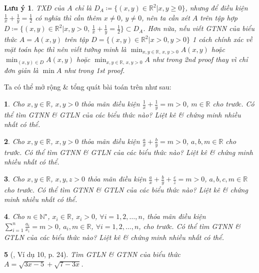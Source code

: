 \documentclass{article}
\newtheorem{baitoan}{}
\newtheorem{luuy}{Lưu ý}
\begin{document}
\begin{luuy}
	TXĐ của $A$ chỉ là $D_A\coloneqq\{(x,y)\in\mathbb{R}^2|x,y\ge0\}$, nhưng để điều kiện $\frac{1}{x} + \frac{1}{y} = \frac{1}{2}$ có nghĩa thì cần thêm $x\ne0$, $y\ne0$, nên ta cần xét $A$ trên tập hợp $D\coloneqq\{(x,y)\in\mathbb{R}^2|x,y > 0,\,\frac{1}{x} + \frac{1}{y} = \frac{1}{2}\}\subset D_A$. Hơn nữa, nếu viết {\rm GTNN} của biểu thức $A = A(x,y)$ trên tập $D = \{(x,y)\in\mathbb{R}^2|x > 0,y > 0\}$ 1 cách chính xác về mặt toán học thì nên viết tường minh là $\min_{x,y\in\mathbb{R},\,x,y > 0} A(x,y)$ hoặc $\min_{(x,y)\in D} A(x,y)$ hoặc $\min_{x,y\in\mathbb{R},\,x,y > 0} A$ như trong 2nd proof thay vì chỉ đơn giản là $\min A$ như trong 1st proof.
\end{luuy}
Ta có thể mở rộng \& tổng quát bài toán trên như sau:

\begin{baitoan}
	Cho $x,y\in\mathbb{R}$, $x,y > 0$ thỏa mãn điều kiện $\frac{1}{x} + \frac{1}{y} = m > 0$, $m\in\mathbb{R}$ cho trước. Có thể tìm {\rm GTNN} \& {\rm GTLN} của các biểu thức nào? Liệt kê \& chứng minh nhiều nhất có thể.
\end{baitoan}

\begin{baitoan}
	Cho $x,y\in\mathbb{R}$, $x,y > 0$ thỏa mãn điều kiện $\frac{a}{x} + \frac{b}{y} = m > 0$, $a,b,m\in\mathbb{R}$ cho trước. Có thể tìm {\rm GTNN} \& {\rm GTLN} của các biểu thức nào? Liệt kê \& chứng minh nhiều nhất có thể.
\end{baitoan}

\begin{baitoan}
	Cho $x,y\in\mathbb{R}$, $x,y,z > 0$ thỏa mãn điều kiện $\frac{a}{x} + \frac{b}{y} + \frac{c}{z} = m > 0$, $a,b,c,m\in\mathbb{R}$ cho trước. Có thể tìm {\rm GTNN} \& {\rm GTLN} của các biểu thức nào? Liệt kê \& chứng minh nhiều nhất có thể.
\end{baitoan}

\begin{baitoan}
	Cho $n\in\mathbb{N}^\star$, $x_i\in\mathbb{R}$, $x_i > 0$, $\forall i = 1,2,\ldots,n$, thỏa mãn điều kiện $\sum_{i=1}^n \frac{a_i}{x_i} = m > 0$, $a_i,m\in\mathbb{R}$, $\forall i = 1,2,\ldots,n$, cho trước. Có thể tìm {\rm GTNN} \& {\rm GTLN} của các biểu thức nào? Liệt kê \& chứng minh nhiều nhất có thể.
\end{baitoan}

\begin{baitoan}[\cite{Tuyen_Toan_9_old}, Ví dụ 10, p. 24]
	Tìm {\rm GTLN} \& {\rm GTNN} của biểu thức $A = \sqrt{3x - 5} + \sqrt{7 - 3x}$.
\end{baitoan}
\end{document}
